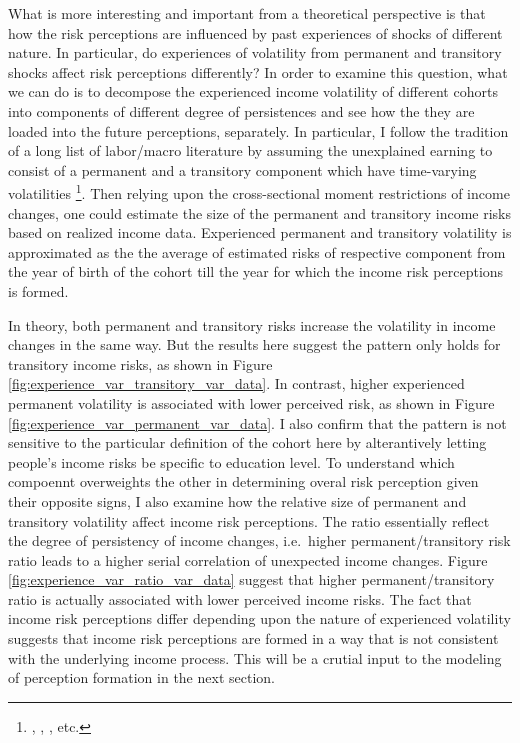 \documentclass[12pt,notitlepage,onecolumn,aps,pra]{article}
\begin{document}
What is more interesting and important from a theoretical perspective is
that how the risk perceptions are influenced by past experiences of
shocks of different nature. In particular, do experiences of volatility
from permanent and transitory shocks affect risk perceptions
differently? In order to examine this question, what we can do is to
decompose the experienced income volatility of different cohorts into
components of different degree of persistences and see how the they are
loaded into the future perceptions, separately. In particular, I follow
the tradition of a long list of labor/macro literature by assuming the
unexplained earning to consist of a permanent and a transitory component
which have time-varying volatilities
\footnote{\cite{gottschalk1994growth}, \cite{carroll1997nature}, \cite{meghir2004income}, etc.}.
Then relying upon the cross-sectional moment restrictions of income
changes, one could estimate the size of the permanent and transitory
income risks based on realized income data. Experienced permanent and
transitory volatility is approximated as the the average of estimated
risks of respective component from the year of birth of the cohort till
the year for which the income risk perceptions is formed.

In theory, both permanent and transitory risks increase the volatility
in income changes in the same way. But the results here suggest the
pattern only holds for transitory income risks, as shown in Figure
\ref{fig:experience_var_transitory_var_data}. In contrast, higher
experienced permanent volatility is associated with lower perceived
risk, as shown in Figure \ref{fig:experience_var_permanent_var_data}. I
also confirm that the pattern is not sensitive to the particular
definition of the cohort here by alterantively letting people's income
risks be specific to education level. To understand which compoennt
overweights the other in determining overal risk perception given their
opposite signs, I also examine how the relative size of permanent and
transitory volatility affect income risk perceptions. The ratio
essentially reflect the degree of persistency of income changes,
i.e.~higher permanent/transitory risk ratio leads to a higher serial
correlation of unexpected income changes. Figure
\ref{fig:experience_var_ratio_var_data} suggest that higher
permanent/transitory ratio is actually associated with lower perceived
income risks. The fact that income risk perceptions differ depending
upon the nature of experienced volatility suggests that income risk
perceptions are formed in a way that is not consistent with the
underlying income process. This will be a crutial input to the modeling
of perception formation in the next section.
\end{document}
